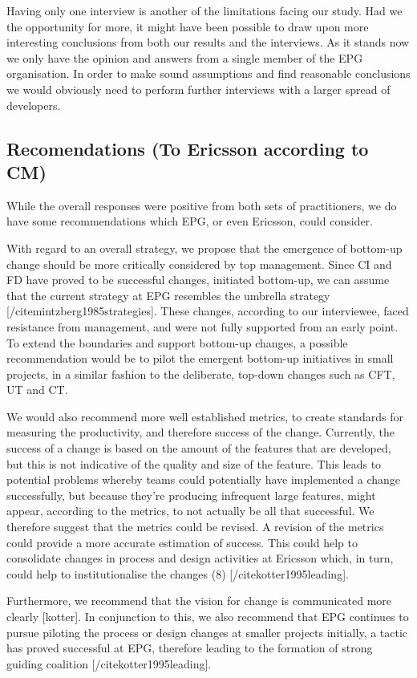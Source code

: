 \documentclass[final_report_innit.tex]{subfiles}
\begin{document}
Having only one interview is another of the limitations facing our study. Had we the opportunity for more, it might have been possible to draw upon more interesting conclusions from both our results and the interviews. As it stands now we only have the opinion and answers from a single member of the EPG organisation. In order to make sound assumptions and find reasonable conclusions we would obviously need to perform further interviews with a larger spread of developers.

\subsection*{Recomendations (To Ericsson according to CM)}

While the overall responses were positive from both sets of practitioners, we do have some recommendations which EPG, or even Ericsson, could consider. 

With regard to an overall strategy, we propose that the emergence of bottom-up change should be more critically considered by top management. Since CI and FD have proved to be successful changes, initiated bottom-up, we can assume that the current strategy at EPG resembles the umbrella strategy [/cite{mintzberg1985strategies}]. These changes, according to our interviewee, faced resistance from management, and were not fully supported from an early point. To extend the boundaries and support bottom-up changes, a possible recommendation would be to pilot the emergent bottom-up initiatives in small projects, in a similar fashion to the deliberate, top-down changes such as CFT, UT and CT. 

We would also recommend more well established metrics, to create standards for measuring the productivity, and therefore success of the change. Currently, the success of a change is based on the amount of the features that are developed, but this is not indicative of the quality and size of the feature. This leads to potential problems whereby teams could potentially have implemented a change successfully, but because they’re producing infrequent large features, might appear, according to the metrics, to not actually be all that successful. We therefore suggest that the metrics could be revised. A revision of the metrics could provide a more accurate estimation of success. This could help to consolidate changes in process and design activities at Ericsson which, in turn, could help to institutionalise the changes (8) [/cite{kotter1995leading}].

Furthermore, we recommend that the vision for change is communicated more clearly [kotter]. In conjunction to this, we also recommend that EPG continues to pursue piloting the process or design changes at smaller projects initially, a tactic has proved successful at EPG, therefore leading to the formation of strong guiding coalition [/cite{kotter1995leading}].
\end{document}
